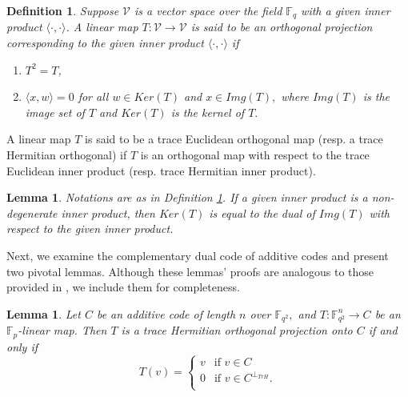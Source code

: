 \documentclass[sn-mathphys-num]{sn-jnl}%
\theoremstyle{thmstyleone}%
\newtheorem{lemma}[theorem]{Lemma}
\theoremstyle{thmstyletwo}%
\theoremstyle{thmstylethree}%
\newtheorem{definition}{Definition}%
\begin{document}
\begin{definition}\cite{complementsubfield}\label{orthomap}
	Suppose $\mathcal{V}$ is a vector space 
	over the field $\mathbb{F}_{q}$ with a given inner product $\langle\cdot ,\cdot\rangle$. A linear map $T: \mathcal{V} \to \mathcal{V}$ is said to be an orthogonal projection corresponding to the given inner product $\langle \cdot, \cdot \rangle$ if
	\begin{enumerate}
		\item $T^2=T$,
		\item $\langle x,w\rangle =0$ for all $w\in Ker(T)$ and $x\in Img(T),$ where $Img(T)$ is the  image set of $T$ and $Ker(T)$ is  the kernel of  $T.$
	\end{enumerate}
\end{definition}
A linear map $T$ is said to be a trace Euclidean orthogonal map (resp. a trace Hermitian orthogonal) if $T$ is an orthogonal map with respect to the trace Euclidean inner product (resp. trace Hermitian inner product).
\begin{lemma}\cite{af4}\label{nondeg}
	Notations are as in Definition \ref{orthomap}. If a given inner product is a non-degenerate inner product, then $Ker(T)$ is equal to the dual of $Img(T)$ with respect to the given inner product.      
\end{lemma}
Next, we examine the complementary dual code of additive codes and present two pivotal lemmas. Although these lemmas' proofs are analogous to those provided in \cite{complementsubfield}, we include them for completeness.
\begin{lemma} \label{tisprojection}
	Let $C$ be an additive code of length $n$ over $\mathbb{F}_{q^2},$ and $T:\mathbb{F}_{q^2}^n\to C $  be an $\mathbb{F}_p$-linear map. Then $T$ is a trace Hermitian  orthogonal projection onto $C$ if and only if \begin{equation*}
		T(v)=\begin{cases}
			v\ \ \text{ if } v\in C \\
			0 \ \ \text{ if }v\in C^{\perp_{TrH}}.\\
		\end{cases}
	\end{equation*} 
\end{lemma}
\end{document}
